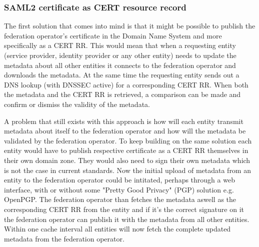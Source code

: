 \subsubsection{SAML2 certificate as CERT resource record}
\label{subsec:saml2-certificate-as-tlsa}
The first solution that comes into mind is that it might be possible to publish the federation operator's certificate in the Domain Name System and more specifically as a CERT RR\cite{rfc:4398}.
This would mean that when a requesting entity (service provider, identity provider or any other entity) needs to update the metadata about all other entities it connects to the federation operator and downloads the metadata.
At the same time the requesting entity sends out a DNS lookup (with DNSSEC active) for a corresponding CERT RR.
When both the metadata and the CERT RR is retrieved, a comparison can be made and confirm or dismiss the validity of the metadata.

A problem that still exists with this approach is how will each entity transmit metadata about itself to the federation operator and how will the metadata be validated by the federation operator.
To keep building on the same solution each entity would have to publish respective certificate as a CERT RR themselves in their own domain zone.
They would also need to sign their own metadata which is not the case in current standards. 
Now the initial upload of metadata from an entity to the federation operator could be intitated, perhaps through a web interface, with or without some "Pretty Good Privacy" (PGP) solution e.g. OpenPGP\cite{rfc:2440}.
The federation operator than fetches the metadata aswell as the corresponding CERT RR from the entity and if it's the correct signature on it the federation operator can publish it with the metadata from all other entities.
Within one cache interval all entities will now fetch the complete updated metadata from the federation operator.

